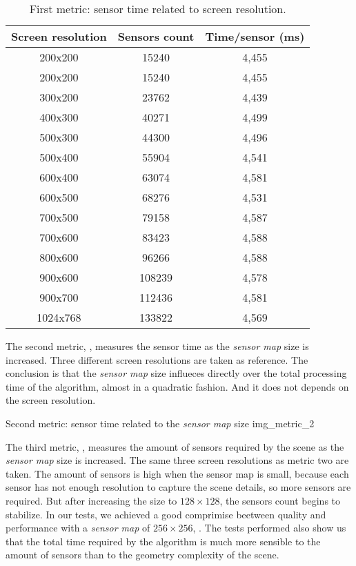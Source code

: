 \documentclass[10pt, conference]{IEEEtran}
\begin{document}
\begin{table}
	\caption{First metric: sensor time related to screen resolution.}
	\label{tab:metric_1}
	\centering
	\begin{tabular}{c|c|c}
		\multicolumn{1}{c}{\bf Screen resolution} &
		\multicolumn{1}{c|}{\bf Sensors count} &
		\multicolumn{1}{c}{\bf  Time/sensor (ms)} \\
		\hline
		200x200	&  15240 & 4,455 \\
		200x200 & 15240 & 4,455 \\
		300x200 & 23762 & 4,439\\
		400x300 & 40271 & 4,499 \\
		500x300 & 44300 & 4,496 \\
		500x400 & 55904 & 4,541 \\
		600x400 & 63074 & 4,581 \\
		600x500 & 68276 & 4,531 \\
		700x500 & 79158 & 4,587 \\
		700x600 & 83423 & 4,588 \\
		800x600 & 96266 & 4,588 \\
		900x600 & 108239 & 4,578 \\
		900x700 & 112436 & 4,581 \\
		1024x768 & 133822 & 4,569\\
	\end{tabular}
\end{table}

The second metric, , measures the sensor time as the \emph{sensor map} size is increased. 
Three different screen resolutions are taken as reference.
The conclusion is that the \emph{sensor map} size influeces directly over the total processing time of the algorithm, almost in a quadratic fashion.
And it does not depends on the screen resolution.

\subimages
	{Second metric: sensor time related to the \emph{sensor map} size}
	{img_metric_2}{
}

The third metric, , measures the amount of sensors required by the scene as the \emph{sensor map} size is increased.
The same three screen resolutions as metric two are taken.
The amount of sensors is high when the sensor map is small, because each sensor has not enough resolution to capture the scene details, so more sensors are required.
But after increasing the size to $128 \times 128$, the sensors count begins to stabilize.
In our tests, we achieved a good comprimise beetween quality and performance with a \emph{sensor map} of $256 \times 256$, .
The tests performed also show us that the total time required by the algorithm is much more sensible to the amount of sensors than to the geometry complexity of the scene.\\
\end{document}
